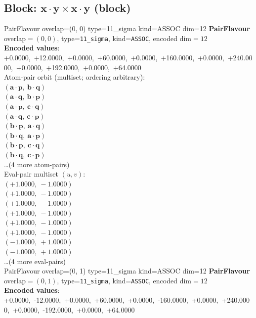 \documentclass[a4paper,11pt]{article}
\newcommand{\pdcegfomjfhook}[2]{\mathbf{#1} \cdot \mathbf{#2}}
\begin{document}
\subsection{Block: $\pdcegfomjfhook{x}{y} \times \pdcegfomjfhook{x}{y}$  (block)}
    PairFlavour  overlap=(0, 0)  type=11\_sigma  kind=ASSOC  dim=12
\textbf{PairFlavour} overlap$=(0, 0)$, type=\texttt{11\_sigma}, kind=\texttt{ASSOC}, encoded dim$=12$\\
\textbf{      Encoded values}: +0.0000,\ +12.0000,\ +0.0000,\ +60.0000,\ +0.0000,\ +160.0000,\ +0.0000,\ +240.0000,\ +0.0000,\ +192.0000,\ +0.0000,\ +64.0000\\
\quad Atom-pair orbit (multiset; ordering arbitrary):\\
$(\pdcegfomjfhook{a}{p},\ \pdcegfomjfhook{b}{q})$\\
$(\pdcegfomjfhook{a}{q},\ \pdcegfomjfhook{b}{p})$\\
$(\pdcegfomjfhook{a}{p},\ \pdcegfomjfhook{c}{q})$\\
$(\pdcegfomjfhook{a}{q},\ \pdcegfomjfhook{c}{p})$\\
$(\pdcegfomjfhook{b}{p},\ \pdcegfomjfhook{a}{q})$\\
$(\pdcegfomjfhook{b}{q},\ \pdcegfomjfhook{a}{p})$\\
$(\pdcegfomjfhook{b}{p},\ \pdcegfomjfhook{c}{q})$\\
$(\pdcegfomjfhook{b}{q},\ \pdcegfomjfhook{c}{p})$\\
\quad \ldots (4 more atom-pairs)\\
\quad Eval-pair multiset $(u, v)$:\\
$(+1.0000,\ -1.0000)$\\
$(+1.0000,\ -1.0000)$\\
$(+1.0000,\ -1.0000)$\\
$(+1.0000,\ -1.0000)$\\
$(+1.0000,\ -1.0000)$\\
$(+1.0000,\ -1.0000)$\\
$(-1.0000,\ +1.0000)$\\
$(-1.0000,\ +1.0000)$\\
\quad \ldots (4 more eval-pairs)\\
    PairFlavour  overlap=(0, 1)  type=11\_sigma  kind=ASSOC  dim=12
\textbf{PairFlavour} overlap$=(0, 1)$, type=\texttt{11\_sigma}, kind=\texttt{ASSOC}, encoded dim$=12$\\
\textbf{      Encoded values}: +0.0000,\ -12.0000,\ +0.0000,\ +60.0000,\ +0.0000,\ -160.0000,\ +0.0000,\ +240.0000,\ +0.0000,\ -192.0000,\ +0.0000,\ +64.0000\\
\end{document}
